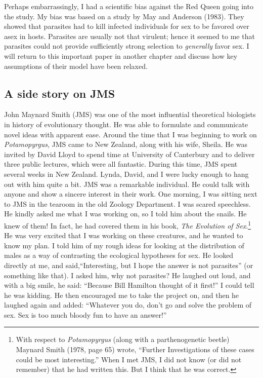 \documentclass[
  letterpaper,
]{book}
\begin{document}
Perhaps embarrassingly, I had a scientific bias against the Red Queen
going into the study. My bias was based on a study by May and Anderson
(1983). They showed that parasites had to kill infected individuals for
sex to be favored over asex in hosts. Parasites are usually not that
virulent; hence it seemed to me that parasites could not provide
sufficiently strong selection to \emph{generally} favor sex. I will
return to this important paper in another chapter and discuss how key
assumptions of their model have been relaxed.

\hypertarget{a-side-story-on-jms}{%
\subsection{A side story on JMS}\label{a-side-story-on-jms}}

John Maynard Smith (JMS) was one of the most influential theoretical
biologists in history of evolutionary thought. He was able to formulate
and communicate novel ideas with apparent ease. Around the time that I
was beginning to work on \emph{Potamopyrgus}, JMS came to New Zealand,
along with his wife, Sheila. He was invited by David Lloyd to spend time
at University of Canterbury and to deliver three public lectures, which
were all fantastic. During this time, JMS spent several weeks in New
Zealand. Lynda, David, and I were lucky enough to hang out with him
quite a bit. JMS was a remarkable individual. He could talk with anyone
and show a sincere interest in their work. One morning, I was sitting
next to JMS in the tearoom in the old Zoology Department. I was scared
speechless. He kindly asked me what I was working on, so I told him
about the snails. He knew of them! In fact, he had covered them in his
book, \emph{The Evolution of Sex}.\footnote{With respect to
  \emph{Potamopyrgus} (along with a parthenogenetic beetle) Maynard
  Smith (1978, page 65) wrote, ``Further Investigations of these cases
  could be most interesting.'' When I met JMS, I did not know (or did
  not remember) that he had written this. But I think that he was
  correct.} He was very excited that I was working on these creatures,
and he wanted to know my plan. I told him of my rough ideas for looking
at the distribution of males as a way of contrasting the ecological
hypotheses for sex. He looked directly at me, and said,``Interesting,
but I hope the answer is not parasites'' (or something like that). I
asked him, why not parasites? He laughed out loud, and with a big smile,
he said: ``Because Bill Hamilton thought of it first!'' I could tell he
was kidding. He then encouraged me to take the project on, and then he
laughed again and added: ``Whatever you do, don't go and solve the
problem of sex. Sex is too much bloody fun to have an answer!''
\end{document}
